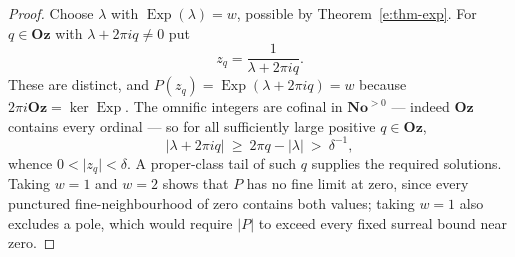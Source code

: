\documentclass[11pt,a4paper]{article}
\numberwithin{equation}{section}
\theoremstyle{definition}
\theoremstyle{remark}
\theoremstyle{plain}
\newcommand{\No}{\mathbf{No}}
\newcommand{\Oz}{\mathbf{Oz}}
\DeclareMathOperator{\Exp}{Exp}
\newcommand{\abs}[1]{\lvert #1\rvert}
\begin{document}
\begin{proof}
Choose $\lambda$ with $\Exp(\lambda)=w$, possible by
Theorem~\ref{e:thm-exp}.  For $q\in\Oz$ with $\lambda+2\pi iq\ne0$ put
\[
 z_q=\frac1{\lambda+2\pi iq} .
\]
These are distinct, and $P(z_q)=\Exp(\lambda+2\pi iq)=w$ because
$2\pi i\Oz=\ker\Exp$.  The omnific integers are cofinal in $\No^{>0}$ ---
indeed $\Oz$ contains every ordinal --- so for all sufficiently large
positive $q\in\Oz$,
\[
 \abs{\lambda+2\pi iq}\ \ge\ 2\pi q-\abs\lambda\ >\ \delta^{-1},
\]
whence $0<\abs{z_q}<\delta$.  A proper-class tail of such $q$ supplies the
required solutions.  Taking $w=1$ and $w=2$ shows that $P$ has no fine
limit at zero, since every punctured fine-neighbourhood of zero contains
both values; taking $w=1$ also excludes a pole, which would require
$\abs P$ to exceed every fixed surreal bound near zero.
\end{proof}
\end{document}

